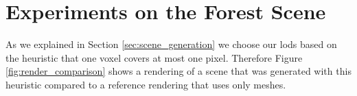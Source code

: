 \section{Experiments on the Forest Scene}
\label{sec:experiments_on_the_forest_scene}
As we explained in Section \ref{sec:scene_generation} we choose our \acsp{lod} based on the heuristic that one voxel covers at most one pixel.
Therefore Figure \ref{fig:render_comparison} shows a rendering of a scene that was generated with this heuristic compared to a reference rendering that uses only meshes.
\begin{figure}[ht]
    \centering
    \begin{subfigure}[b]{\linewidth}
\end{subfigure}
\end{figure}
